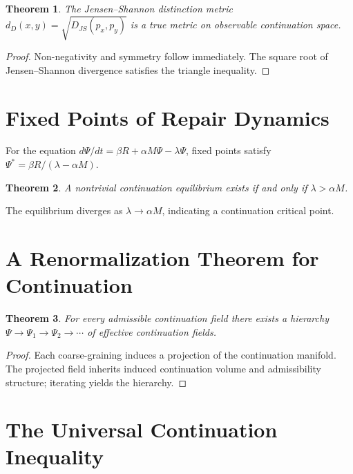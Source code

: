 \documentclass[12pt,a4paper]{article}
\newtheorem{theorem}{Theorem}[section]
\begin{document}
\begin{theorem}
The Jensen--Shannon distinction metric $d_D(x,y) = \sqrt{D_{JS}(p_x, p_y)}$ is a true metric on observable continuation space.
\end{theorem}

\begin{proof}
Non-negativity and symmetry follow immediately. The square root of Jensen--Shannon divergence satisfies the triangle inequality.
\end{proof}

\section{Fixed Points of Repair Dynamics}

For the equation $d\Psi/dt = \beta R + \alpha M\Psi - \lambda\Psi$, fixed points satisfy $\Psi^* = \beta R / (\lambda - \alpha M)$.

\begin{theorem}
A nontrivial continuation equilibrium exists if and only if $\lambda > \alpha M$.
\end{theorem}

The equilibrium diverges as $\lambda \to \alpha M$, indicating a continuation critical point.

\section{A Renormalization Theorem for Continuation}

\begin{theorem}
For every admissible continuation field there exists a hierarchy $\Psi \to \Psi_1 \to \Psi_2 \to \cdots$ of effective continuation fields.
\end{theorem}

\begin{proof}
Each coarse-graining induces a projection of the continuation manifold. The projected field inherits induced continuation volume and admissibility structure; iterating yields the hierarchy.
\end{proof}

\section{The Universal Continuation Inequality}
\end{document}

